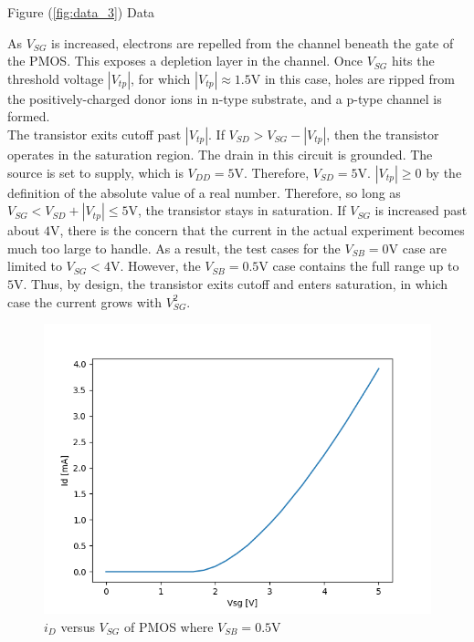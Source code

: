 \FloatBarrier

\FloatBarrier

\begin{table}[h!]
	\centering
	\caption{Figure (\ref{fig:data_3}) Data}
	\label{tab:data_3}
\end{table}

\FloatBarrier

As $V_{SG}$ is increased, electrons are repelled from the channel beneath the gate of the PMOS.
This exposes a depletion layer in the channel.
Once $V_{SG}$ hits the threshold voltage $|V_{tp}|$, for which $|V_{tp}| \approx 1.5$\si{\volt} in this case, holes are ripped from the positively-charged donor ions in n-type substrate, and a p-type channel is formed. \\

The transistor exits cutoff past $|V_{tp}|$.
If $V_{SD} > V_{SG} - |V_{tp}|$, then the transistor operates in the saturation region.
The drain in this circuit is grounded.
The source is set to supply, which is $V_{DD} = 5$\si{\volt}.
Therefore, $V_{SD} = 5$\si{\volt}.
$|V_{tp}| \geq 0$ by the definition of the absolute value of a real number.
Therefore, so long as $V_{SG} < V_{SD} + |V_{tp}| \leq 5$\si{\volt}, the transistor stays in saturation.
If $V_{SG}$ is increased past about $4$\si{\volt}, there is the concern that the current in the actual experiment becomes much too large to handle.
As a result, the test cases for the $V_{SB} = 0$\si{\volt} case are limited to $V_{SG} < 4$\si{\volt}.
However, the $V_{SB} = 0.5$\si{\volt} case contains the full range up to $5$\si{\volt}.
Thus, by design, the transistor exits cutoff and enters saturation, in which case the current grows with $V_{SG}^{2}$. \\

\FloatBarrier

\begin{figure}[h!]
	\centering
	\includegraphics[scale=0.75]{./images/data_3_b.PNG}
	\caption{$i_{D}$ versus $V_{SG}$ of PMOS where $V_{SB}= 0.5$\si{\volt}}
	\label{fig:data_3_b}
\end{figure}


